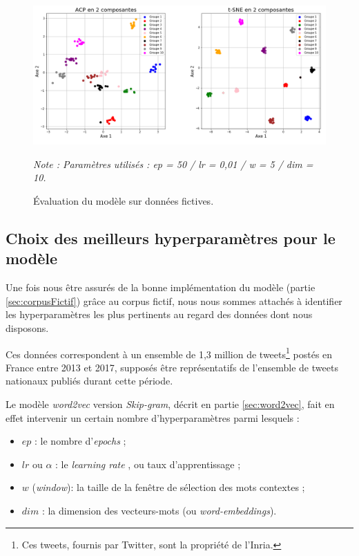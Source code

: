 \documentclass[11pt,french,french]{article}
\let\rmarkdownfootnote\footnote%
\def\footnote{\protect\rmarkdownfootnote}
\begin{document}
\begin{figure}
\begin{center}
\includegraphics[width=1\textwidth]{img/figures2.png}
\captionsetup{margin=0cm,format=hang,justification=justified}
\caption{Évaluation du modèle sur données fictives.}\label{fig:figure_evaluation}
\end{center}
\vspace{-0.3cm}
\footnotesize
\emph{Note : Paramètres utilisés : ep = 50 / lr = 0,01 / w = 5 / dim = 10.}
\end{figure}

\subsection{Choix des meilleurs hyperparamètres pour le
modèle}\label{sec:hyperparametres}

Une fois nous être assurés de la bonne implémentation du modèle (partie
\ref{sec:corpusFictif}) grâce au corpus fictif, nous nous sommes
attachés à identifier les hyperparamètres les plus pertinents au regard
des données dont nous disposons.

Ces données correspondent à un ensemble de 1,3 million de
tweets\footnote{Ces tweets, fournis par Twitter, sont la propriété de
  l'Inria.} postés en France entre 2013 et 2017, supposés être
représentatifs de l'ensemble de tweets nationaux publiés durant cette
période.

Le modèle \emph{word2vec} version \emph{Skip-gram}, décrit en partie
\ref{sec:word2vec}, fait en effet intervenir un certain nombre
d'hyperparamètres parmi lesquels :

\begin{itemize}
\item $ep$ : le nombre d'\og \emph{epochs} \fg{} ;
\item $lr$ ou $\alpha$ : le \og \emph{learning rate} \fg, ou taux d'apprentissage ;
\item $w$ (\emph{window}): la taille de la fenêtre de sélection des mots contextes ;
\item $dim$ : la dimension des vecteurs-mots (ou \emph{word-embeddings}).
\end{itemize}
\end{document}
